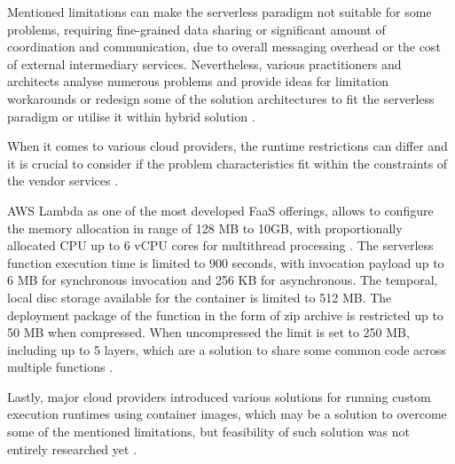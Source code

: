 Mentioned limitations can make the serverless paradigm not suitable for some problems, requiring fine-grained data sharing or significant amount of coordination and communication, due to overall messaging overhead or the cost of external intermediary services.
Nevertheless, various practitioners and architects analyse numerous problems and provide ideas for limitation workarounds or redesign some of the solution architectures to fit the serverless paradigm or utilise it within hybrid solution \cite{BerkeleyServerless}.

When it comes to various cloud providers, the runtime restrictions can differ and it is crucial to consider if the problem characteristics fit within the constraints of the vendor services \cite{LeveragingServerlessCloudComputingArchitectures}.

AWS Lambda \cite{AWSLambdaQuotas} as one of the most developed FaaS offerings, allows to configure the memory allocation in range of 128 MB to 10GB, with proportionally allocated CPU up to 6 vCPU cores for multithread processing \cite{AWSLambdaRAMandCPU}.
The serverless function execution time is limited to 900 seconds, with invocation payload up to 6 MB for synchronous invocation and 256 KB for asynchronous.
The temporal, local disc storage available for the container is limited to 512 MB.
The deployment package of the function in the form of zip archive is restricted up to 50 MB when compressed. When uncompressed the limit is set to 250 MB, including up to 5 layers, which are a solution to share some common code across multiple functions \cite{EvaluationOfServerlessApplicationProgrammingModel}.

Lastly, major cloud providers introduced various solutions for running custom execution runtimes using container images, which may be a solution to overcome some of the mentioned limitations, but feasibility of such solution was not entirely researched yet \cite{AWSLambdaContainerImageSupport}.



